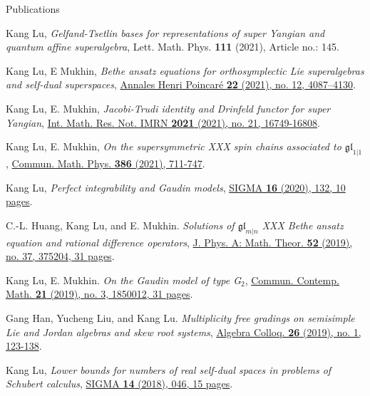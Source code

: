 \documentclass{resume} %
\begin{document}
\begin{rSection}{Publications}
\begin{etaremune}[leftmargin=0cm]
\item Kang Lu, {\it Gelfand-Tsetlin bases for representations of super Yangian and quantum affine superalgebra}, Lett. Math. Phys. \textbf{111} (2021), Article no.: 145.

\item Kang Lu, E Mukhin, {\it Bethe ansatz equations for orthosymplectic Lie superalgebras and self-dual superspaces}, \href{https://doi.org/10.1007/s00023-021-01091-8}{Annales Henri Poincar\'{e} \textbf{22} (2021), no. 12, 4087--4130}.

\item Kang Lu, E. Mukhin, {\it Jacobi-Trudi identity and Drinfeld functor for super Yangian}, \href{https://dx.doi.org/10.1093/imrn/rnab023}{Int. Math. Res. Not. IMRN \textbf{2021} (2021), no. 21, 16749-16808}.

\item Kang Lu, E. Mukhin, {\it On the supersymmetric XXX spin chains associated to $\mathfrak{gl}_{1|1}$}, \href{https://dx.doi.org/10.1007/s00220-021-04155-2}{Commun. Math. Phys. \textbf{386} (2021), 711-747}.

\item Kang Lu, {\it Perfect integrability and Gaudin models}, \href{https://doi.org/10.3842/SIGMA.2020.132}{SIGMA {\bf 16} (2020), 132, 10 pages}.

\item C.-L. Huang, Kang Lu, and E. Mukhin.
{\it Solutions of $\mathfrak{gl}_{m|n}$ XXX Bethe ansatz equation and rational difference operators}, \href{https://doi.org/10.1088/1751-8121/ab1960}{J. Phys. A: Math. Theor. \textbf{52} (2019), no. 37, 375204, 31 pages}.	
			
\item Kang Lu, E. Mukhin. 
{\it On the Gaudin model of type G$_2$}, \href{https://doi.org/10.1142/S0219199718500128}{Commun. Contemp. Math. \textbf{21} (2019), no. 3, 1850012, 31 pages}.

\item Gang Han, Yucheng Liu, and Kang Lu. {\it Multiplicity free gradings on semisimple Lie and Jordan algebras and skew root systems}, \href{https://doi.org/10.1142/S1005386719000129}{Algebra Colloq. {\bf 26} (2019), no. 1, 123-138}.
			
\item Kang Lu, {\it Lower bounds for numbers of real self-dual spaces in problems of Schubert calculus}, \href{https://doi.org/10.3842/SIGMA.2018.046}{SIGMA {\bf 14} (2018), 046, 15 pages}.	
			

\end{etaremune}
\end{rSection}
\end{document}
